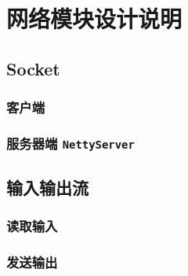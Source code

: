 \ifx\maindoc\undefined
{}
\fi

\section{网络模块设计说明}
\subsection{Socket}
\subsubsection{客户端}
\subsubsection{服务器端 \texttt{NettyServer}}
\subsection{输入输出流}
\subsubsection{读取输入}
\subsubsection{发送输出}
